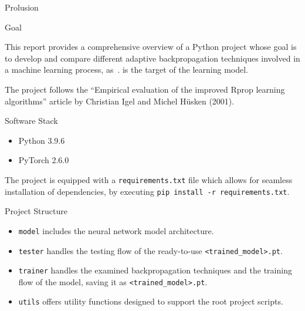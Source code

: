 \begin{chapter}{Prolusion}
    \begin{section}{Goal}
        \par This report provides a comprehensive overview of a Python project whose goal is to develop and compare different adaptive backpropagation techniques involved in a machine learning process, as~.  is the target of the learning model.
		\par The project follows the ``Empirical evaluation of the improved Rprop learning algorithms'' article by Christian Igel and Michel Hüsken (2001).
    \end{section}
    \newpage
	\begin{section}{Software Stack}
		\begin{itemize}
			\item Python 3.9.6
			\item PyTorch 2.6.0
		\end{itemize}
		The project is equipped with a \texttt{requirements.txt} file which allows for seamless installation of dependencies, by executing \texttt{pip install -r requirements.txt}.
	\end{section}
	\newpage
	\begin{section}{Project Structure}
		\medskip
		\begin{itemize}
			\item \texttt{model} includes the neural network model architecture.
			\item \texttt{tester} handles the testing flow of the ready-to-use \texttt{<trained\_model>.pt}.
			\item \texttt{trainer} handles the examined backpropagation techniques and the training flow of the model, saving it as \texttt{<trained\_model>.pt}.
			\item \texttt{utils} offers utility functions designed to support the root project scripts.
		\end{itemize}
	\end{section}
\end{chapter}